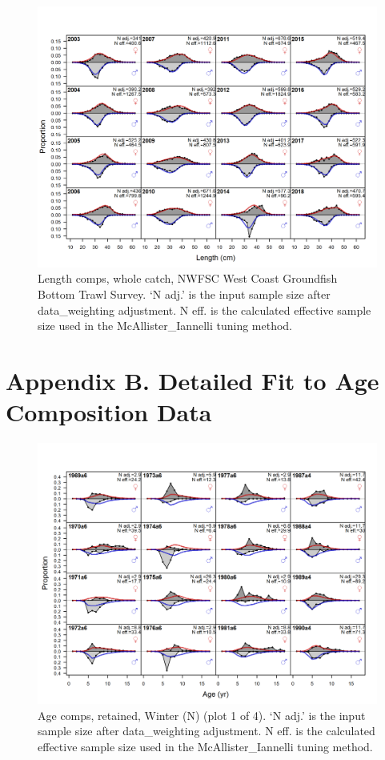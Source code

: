 \documentclass[12pt,]{article}
\begin{document}
\begin{figure}
\centering
\includegraphics{r4ss/plots_mod1/comp_lenfit_flt7mkt0.png}
\caption{Length comps, whole catch, NWFSC West Coast Groundfish Bottom
Trawl Survey. `N adj.' is the input sample size after data\_weighting
adjustment. N eff. is the calculated effective sample size used in the
McAllister\_Iannelli tuning method. \label{fig:length_fits}}
\end{figure}

\FloatBarrier

\hypertarget{append_b}{\section{Appendix B. Detailed Fit to Age
Composition Data}\label{append_b}}

\begin{figure}
\centering
\includegraphics{r4ss/plots_mod1/comp_agefit_flt1mkt2_page1.png}
\caption{Age comps, retained, Winter (N) (plot 1 of 4). `N adj.' is the
input sample size after data\_weighting adjustment. N eff. is the
calculated effective sample size used in the McAllister\_Iannelli tuning
method. \label{fig:age_fits}}
\end{figure}
\end{document}
